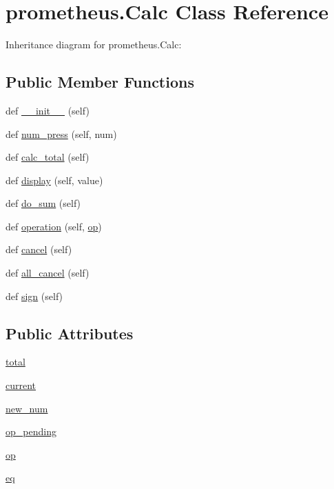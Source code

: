 \hypertarget{classprometheus_1_1_calc}{}\section{prometheus.\+Calc Class Reference}
\label{classprometheus_1_1_calc}


Inheritance diagram for prometheus.\+Calc\+:
\subsection*{Public Member Functions}
\begin{DoxyCompactItemize}
\item 
def \hyperlink{classprometheus_1_1_calc_aff8cfb253409505c245bfc1bdd4e3526}{\+\_\+\+\_\+init\+\_\+\+\_\+} (self)
\item 
def \hyperlink{classprometheus_1_1_calc_a07896a25fd3444f85ca211f4aaa4ddde}{num\+\_\+press} (self, num)
\item 
def \hyperlink{classprometheus_1_1_calc_af793a58cceed8c017b95994ecf081c8b}{calc\+\_\+total} (self)
\item 
def \hyperlink{classprometheus_1_1_calc_ad5fa8829115da42091276529393368ec}{display} (self, value)
\item 
def \hyperlink{classprometheus_1_1_calc_a9679f9d1cfcab4c279ecb589394ef731}{do\+\_\+sum} (self)
\item 
def \hyperlink{classprometheus_1_1_calc_a847ac31ac113eb612cf4fff346077706}{operation} (self, \hyperlink{classprometheus_1_1_calc_aedb9cce0ff1460e79b5c891ec586a2e5}{op})
\item 
def \hyperlink{classprometheus_1_1_calc_a7db7b95073430e38f45eaca87da7884c}{cancel} (self)
\item 
def \hyperlink{classprometheus_1_1_calc_a6dc4980460464e30147e5ad4cae23ba1}{all\+\_\+cancel} (self)
\item 
def \hyperlink{classprometheus_1_1_calc_a4494a960d25c3fa3398ca14defc86ee1}{sign} (self)
\end{DoxyCompactItemize}
\subsection*{Public Attributes}
\begin{DoxyCompactItemize}
\item 
\hyperlink{classprometheus_1_1_calc_a2adf3713d05b45af5e006fb75ffa76a3}{total}
\item 
\hyperlink{classprometheus_1_1_calc_a2412692091e25543bb96c1e1abd0572c}{current}
\item 
\hyperlink{classprometheus_1_1_calc_a8f8b00b547a8f8f12d07d2a70de91780}{new\+\_\+num}
\item 
\hyperlink{classprometheus_1_1_calc_a4418a12226daea13b6ed01e5b1b87c37}{op\+\_\+pending}
\item 
\hyperlink{classprometheus_1_1_calc_aedb9cce0ff1460e79b5c891ec586a2e5}{op}
\item 
\hyperlink{classprometheus_1_1_calc_acea8a5a749f5ddc51608db16bde5c471}{eq}
\end{DoxyCompactItemize}


